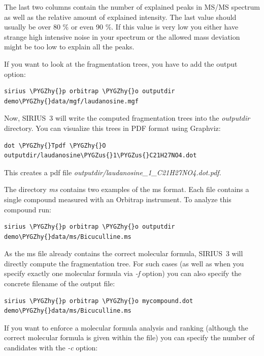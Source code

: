 \documentclass[letterpaper,10pt,openany,oneside]{sphinxmanual}
\def\PYGZus{\char`\_}
\def\PYGZhy{\char`\-}
\begin{document}
The last two columns contain the number of explained peaks in MS/MS spectrum as well as the relative amount of explained intensity. The last value should usually be over 80 \% or even 90 \%. If this value is very low you either have strange high intensive noise in your spectrum or the allowed mass deviation might be too low to explain all the peaks.

If you want to look at the fragmentation trees, you have to add the output
option:

\begin{Verbatim}[commandchars=\\\{\}]
sirius \PYGZhy{}p orbitrap \PYGZhy{}o outputdir demo\PYGZhy{}data/mgf/laudanosine.mgf
\end{Verbatim}

Now, SIRIUS~3 will write the computed fragmentation trees into
the \emph{outputdir} directory. You can visualize this trees in PDF format
using Graphviz:

\begin{Verbatim}[commandchars=\\\{\}]
dot \PYGZhy{}Tpdf \PYGZhy{}O outputdir/laudanosine\PYGZus{}1\PYGZus{}C21H27NO4.dot
\end{Verbatim}

This creates a pdf file \emph{outputdir/laudanosine\_1\_C21H27NO4.dot.pdf}.

The directory \emph{ms} contains two examples of the ms format. Each file contains a single compound measured with an Orbitrap instrument. To analyze this compound run:

\begin{Verbatim}[commandchars=\\\{\}]
sirius \PYGZhy{}p orbitrap \PYGZhy{}o outputdir demo\PYGZhy{}data/ms/Bicuculline.ms
\end{Verbatim}

As the ms file already contains the correct molecular formula, SIRIUS~3 will
directly compute the fragmentation tree. For such cases (as well as when you
specify exactly one molecular formula via \emph{-f} option) you can also
specify the concrete filename of the output file:

\begin{Verbatim}[commandchars=\\\{\}]
sirius \PYGZhy{}p orbitrap \PYGZhy{}o mycompound.dot demo\PYGZhy{}data/ms/Bicuculline.ms
\end{Verbatim}

If you want to enforce a molecular formula analysis and ranking (although the correct molecular formula is given within the file) you can specify the number of candidates with the \emph{-c} option:
\end{document}
